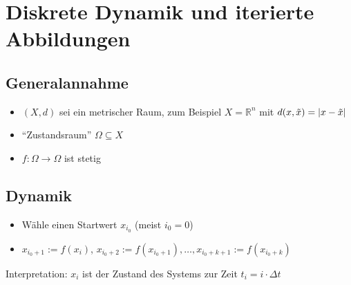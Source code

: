 \section{Diskrete Dynamik und iterierte Abbildungen} %
\label{sec:1}

\subsection*{Generalannahme} %
\label{sub:Generalannahme}
\begin{itemize}
	\item $(X,d)$ sei ein metrischer Raum, zum Beispiel $X=\mathds{R}^n$ mit $d(x,\tilde{x})= \abs*{x - \tilde{x}}$
	\item \enquote{Zustandsraum} $\Omega \subseteq X$
	\item $f \colon \Omega \to \Omega$ ist stetig
\end{itemize}

\subsection*{Dynamik} %
\label{sub:dynamik}
\begin{itemize}
	\item Wähle einen Startwert $x_{i_0}$ (meist $i_0 =0$)
	\item $x_{i_0+1} := f(x_i)$, $x_{i_0+2} := f(x_{i_0+1}), \ldots, x_{i_0+k+1} := f(x_{i_0+k})$
\end{itemize}
Interpretation: $x_i$ ist der Zustand des Systems zur Zeit $t_i= i \cdot \Delta t$

